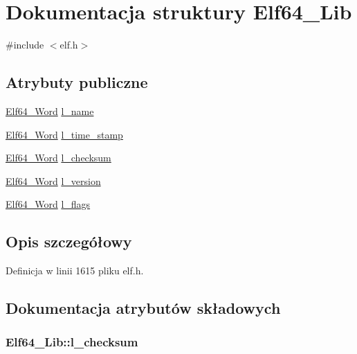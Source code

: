 \hypertarget{struct_elf64___lib}{\section{Dokumentacja struktury Elf64\-\_\-\-Lib}
\label{struct_elf64___lib}
}


{\ttfamily \#include $<$elf.\-h$>$}

\subsection*{Atrybuty publiczne}
\begin{DoxyCompactItemize}
\item 
\hyperlink{elf_8h_aa3aa1920ed115b7ef7e99716fece4401}{Elf64\-\_\-\-Word} \hyperlink{struct_elf64___lib_ac7f21d23c86f56c6583aa563eb960af0}{l\-\_\-name}
\item 
\hyperlink{elf_8h_aa3aa1920ed115b7ef7e99716fece4401}{Elf64\-\_\-\-Word} \hyperlink{struct_elf64___lib_ace001f85c3f31e91fedf4a1a1f923af5}{l\-\_\-time\-\_\-stamp}
\item 
\hyperlink{elf_8h_aa3aa1920ed115b7ef7e99716fece4401}{Elf64\-\_\-\-Word} \hyperlink{struct_elf64___lib_a11f09b77bcae792d5e5c120b4a0fbcca}{l\-\_\-checksum}
\item 
\hyperlink{elf_8h_aa3aa1920ed115b7ef7e99716fece4401}{Elf64\-\_\-\-Word} \hyperlink{struct_elf64___lib_ab03d7034a6f1113717a9eefe33cb8343}{l\-\_\-version}
\item 
\hyperlink{elf_8h_aa3aa1920ed115b7ef7e99716fece4401}{Elf64\-\_\-\-Word} \hyperlink{struct_elf64___lib_ac78fa7eafc377b04fcaf575c61dc2b60}{l\-\_\-flags}
\end{DoxyCompactItemize}


\subsection{Opis szczegółowy}


Definicja w linii 1615 pliku elf.\-h.



\subsection{Dokumentacja atrybutów składowych}
\hypertarget{struct_elf64___lib_a11f09b77bcae792d5e5c120b4a0fbcca}{
\subsubsection[{l\-\_\-checksum}]{ Elf64\-\_\-\-Lib\-::l\-\_\-checksum}}\label{struct_elf64___lib_a11f09b77bcae792d5e5c120b4a0fbcca}


